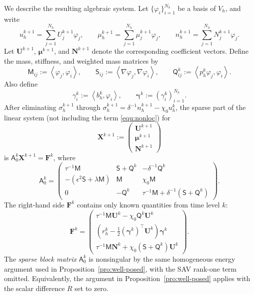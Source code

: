 \documentclass[11pt, reqno]{amsart}
\theoremstyle{definition}
\numberwithin{equation}{section}
\newcommand{\inpro}[2]{\left\langle#1,#2\right\rangle}
\begin{document}
{We describe the resulting algebraic system. Let
$\{\varphi_i\}_{i=1}^{N_h}$ be a basis of $V_h$, and write
\[
u_h^{k+1}=\sum_{j=1}^{N_h}U_j^{k+1}\varphi_j,
\qquad
\mu_h^{k+1}=\sum_{j=1}^{N_h}\mu_j^{k+1}\varphi_j,
\qquad
n_h^{k+1}=\sum_{j=1}^{N_h}N_j^{k+1}\varphi_j.
\]
Let $\mathbf U^{k+1}$, $\boldsymbol{\mu}^{k+1}$, and $\mathbf N^{k+1}$ denote the corresponding coefficient vectors. Define the mass, stiffness, and weighted mass matrices by
\[
\mathsf M_{ij}:=\inpro{\varphi_j}{\varphi_i},
\qquad
\mathsf S_{ij}:=\inpro{\nabla\varphi_j}{\nabla\varphi_i},
\qquad
\mathsf Q^k_{ij}:=\inpro{p_h^k \varphi_j}{\varphi_i}.
\]
Also define
\[
\gamma_i^k:=\inpro{b_h^k}{\varphi_i},
\qquad
\boldsymbol{\gamma}^k:=(\gamma_i^k)_{i=1}^{N_h}.
\]
After eliminating $\sigma_h^{k+1}$ through $\sigma_h^{k+1}
=
\delta^{-1}n_h^{k+1}-\chi_0u_h^k$, the sparse part of the linear system (not including the term \eqref{equ:nonloc}) for
\[
\mathbf X^{k+1}:=
\begin{pmatrix}
	\mathbf U^{k+1}\\
	\boldsymbol{\mu}^{k+1}\\
	\mathbf N^{k+1}
\end{pmatrix}
\]
is $\mathsf A_0^k\mathbf X^{k+1}
=
\mathbf F^k$,
where
\[
\mathsf A_0^k
=
\begin{pmatrix}
	\tau^{-1}\mathsf M
	&
	\mathsf S+\mathsf Q^k
	&
	-\delta^{-1}\mathsf Q^k
	\\[2mm]
	-(\epsilon^2\mathsf S+\lambda\mathsf M)
	&
	\mathsf M
	&
	\chi_0\mathsf M
	\\[2mm]
	0
	&
	-\mathsf Q^k
	&
	\tau^{-1}\mathsf M+\delta^{-1}(\mathsf S+\mathsf Q^k)
\end{pmatrix}.
\]
The right-hand side $\mathbf F^k$ contains only known quantities from time level $k$:
\[
\mathbf F^k
=
\begin{pmatrix}
	\tau^{-1}\mathsf M\mathbf U^k-\chi_0\mathsf Q^k\mathbf U^k
	\\[1mm]
	\left(
	r_h^k-\frac12(\boldsymbol{\gamma}^k)^\top \mathbf U^k
	\right)\boldsymbol{\gamma}^k
	\\[1mm]
	\tau^{-1}\mathsf M\mathbf N^k
	+
	\chi_0(\mathsf S+\mathsf Q^k)\mathbf U^k
\end{pmatrix}.
\]
The \emph{sparse block matrix} $\mathsf A_0^k$ is nonsingular by the same homogeneous
energy argument used in Proposition~\ref{pro:well-posed}, with the SAV rank-one
term omitted. Equivalently, the argument in Proposition~\ref{pro:well-posed}
applies with the scalar difference $R$ set to zero.

}
\end{document}

